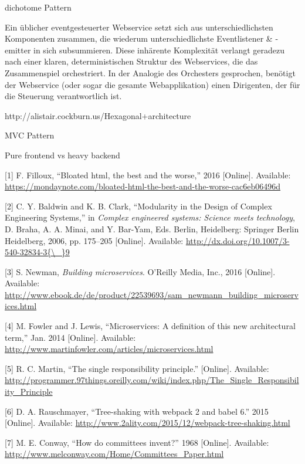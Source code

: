 \documentclass[]{article}
\begin{document}
dichotome Pattern

Ein üblicher eventgesteuerter Webservice setzt sich aus
unterschiedlichsten Komponenten zusammen, die wiederum
unterschiedlichste Eventlistener \& -emitter in sich subsummieren. Diese
inhärente Komplexität verlangt geradezu nach einer klaren,
deterministischen Struktur des Webservices, die das Zusammenspiel
orchestriert. In der Analogie des Orchesters gesprochen, benötigt der
Webservice (oder sogar die gesamte Webapplikation) einen Dirigenten, der
für die Steuerung verantwortlich ist.

http://alistair.cockburn.us/Hexagonal+architecture

MVC Pattern

Pure frontend vs heavy backend

\hypertarget{refs}{}
\hypertarget{ref-Filloux2016}{}
{[}1{]} F. Filloux, ``Bloated html, the best and the worse,'' 2016
{[}Online{]}. Available:
\url{https://mondaynote.com/bloated-html-the-best-and-the-worse-cac6eb06496d}

\hypertarget{ref-Baldwin2006}{}
{[}2{]} C. Y. Baldwin and K. B. Clark, ``Modularity in the Design of
Complex Engineering Systems,'' in \emph{Complex engineered systems:
Science meets technology}, D. Braha, A. A. Minai, and Y. Bar-Yam, Eds.
Berlin, Heidelberg: Springer Berlin Heidelberg, 2006, pp. 175--205
{[}Online{]}. Available:
\href{http://dx.doi.org/10.1007/3-540-32834-3\%7B/_\%7D9}{http://dx.doi.org/10.1007/3-540-32834-3\{\textbackslash{}\_\}9}

\hypertarget{ref-Newman2015}{}
{[}3{]} S. Newman, \emph{Building microservices}. O'Reilly Media, Inc.,
2016 {[}Online{]}. Available:
\url{http://www.ebook.de/de/product/22539693/sam_newmann_building_microservices.html}

\hypertarget{ref-Fowler2014}{}
{[}4{]} M. Fowler and J. Lewis, ``Microservices: A definition of this
new architectural term,'' Jan. 2014 {[}Online{]}. Available:
\url{http://www.martinfowler.com/articles/microservices.html}

\hypertarget{ref-Martin}{}
{[}5{]} R. C. Martin, ``The single responsibility principle.''
{[}Online{]}. Available:
\url{http://programmer.97things.oreilly.com/wiki/index.php/The_Single_Responsibility_Principle}

\hypertarget{ref-Rauschmayer2015}{}
{[}6{]} D. A. Rauschmayer, ``Tree-shaking with webpack 2 and babel 6.''
2015 {[}Online{]}. Available:
\url{http://www.2ality.com/2015/12/webpack-tree-shaking.html}

\hypertarget{ref-Conway1968}{}
{[}7{]} M. E. Conway, ``How do committees invent?'' 1968 {[}Online{]}.
Available: \url{http://www.melconway.com/Home/Committees_Paper.html}
\end{document}
